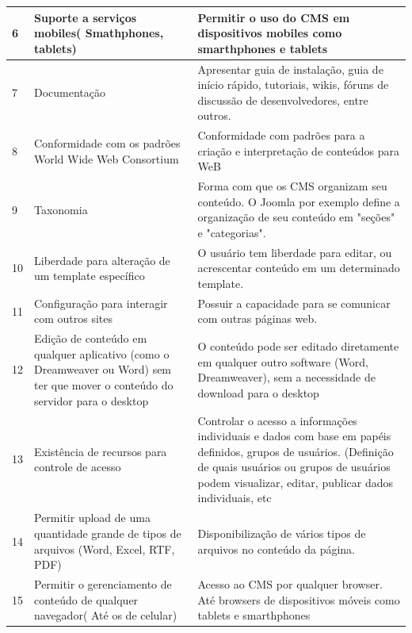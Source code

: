 \begin{apendicesenv}
\begin{landscape}
\begin{longtable}{|p{10pt}|p{220pt}|p{415pt}|}
 	 {\raggedright {6}}
 	  	 	 	 	 & {\raggedright {Suporte a serviços mobiles( Smathphones, tablets)}}
 	  	 	 	 	 & {\raggedright {Permitir o uso do CMS em dispositivos mobiles como smarthphones e tablets \cite{Jones}}}\\
 	  	 	 	 	\hline
 	 {\raggedright {7}}
 	  	 	 	 	 & {\raggedright {Documentação}}
 	  	 	 	 	 & {\raggedright {Apresentar guia de instalação, guia de início rápido, tutoriais, wikis, fóruns de discussão de desenvolvedores, entre outros. \cite{Reis}}}\\
 	  	 	 	 	\hline
 	 {\raggedright {8}}
 	  	 	 	 	 & {\raggedright {Conformidade com os padrões World Wide Web Consortium}}
 	  	 	 	 	 & {\raggedright {Conformidade com padrões para a criação e interpretação de conteúdos para WeB \cite{Reis}
 	  	 	 	 	  }}\\
 	  	 	 	 	\hline
 	  	 	 	 	{\raggedright {9}}
 	  	 	 	 	 & {\raggedright {Taxonomia}}
 	  	 	 	 	 	 	 	 	 & {\raggedright {Forma com que os CMS organizam seu conteúdo. O Joomla por exemplo define a organização de seu conteúdo em "seções" e "categorias". \cite{costa} }}\\
 	  	 	 	 	 	 	 	 	\hline 
 	 {\raggedright {10}}
 	  	 	 	 	 & {\raggedright {Liberdade para alteração de um template específico}}
 	  	 	 	 	 & {\raggedright {O usuário tem liberdade para editar, ou acrescentar conteúdo em um determinado template. \cite{Reis}}}\\
 	  	 	 	 	\hline	 	 	 	
{\raggedright {11}}
 	 	 & {\raggedright {Configuração para interagir com outros sites}}
 	 	 & {\raggedright {Possuir a capacidade para se comunicar com outras páginas web. \cite{Reis} }}\\
 	 	\hline
 	{\raggedright {12}}
 	 	 & {\raggedright {Edição de conteúdo em qualquer aplicativo (como o Dreamweaver ou Word) sem ter que mover o conteúdo do servidor para o desktop}}
 	 	 & {\raggedright {O conteúdo pode ser editado diretamente em qualquer outro software (Word, Dreamweaver), sem a necessidade de download para o desktop \cite{gadja}}}\\
 	 	\hline
 	{\raggedright {13}}
 	 	 & {\raggedright {Existência de recursos para controle de acesso}}
 	 	 & {\raggedright {Controlar o acesso a informações individuais e dados com base em papéis definidos, grupos de usuários. (Definição de quais usuários ou grupos de usuários podem visualizar, editar, publicar
 	 	 dados individuais, etc} \cite{Ennert2012}}\\
 	 	\hline
 	 	{\raggedright {14}}
 	 	 	 	 & {\raggedright {Permitir upload de uma quantidade grande de tipos de arquivos (Word, Excel, RTF, PDF)}}
 	 	 	 	 & {\raggedright {Disponibilização de vários tipos de arquivos no conteúdo da página. \cite{gadja}}}\\
 	 	 	 	\hline
 	 {\raggedright {15}}
 	  	 	 	 	 & {\raggedright {Permitir o gerenciamento de conteúdo de qualquer navegador( Até os de celular)}}
 	  	 	 	 	 & {\raggedright {Acesso ao CMS por qualquer browser. Até browsers de dispositivos móveis como tablets e smarthphones \cite{gadja}}}\\
 	  	 	 	 	\hline
 	  	 	 	 	

\end{longtable}
\end{landscape}
\end{apendicesenv}
